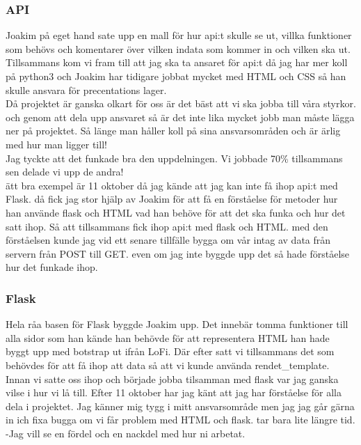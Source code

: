 \documentclass{TDP003mall}
\begin{document}
\subsubsection{API}
Joakim på eget hand sate upp en mall för hur api:t skulle se ut, villka funktioner som behövs och komentarer över vilken indata som kommer in och vilken ska ut. Tillsammans kom vi fram till att jag ska ta ansaret för api:t då jag har mer koll på python3 och Joakim har tidigare jobbat mycket med HTML och CSS så han skulle ansvara för precentations lager.\\
Då projektet är ganska olkart för oss är det bäst att vi ska jobba till våra styrkor. 
och genom att dela upp ansvaret så är det inte lika mycket jobb man måste lägga ner på projektet. Så länge man håller koll på sina ansvarsområden och är ärlig med hur man ligger till!\\ 
Jag tyckte att det funkade bra den uppdelningen. Vi jobbade 70\% tillsammans sen delade vi upp de andra!\\ 
ätt bra exempel är 11 oktober då jag kände att jag kan inte få ihop api:t med Flask. då fick jag stor hjälp av Joakim för att få en förståelse för metoder hur han använde flask och HTML vad han behöve för att det ska funka och hur det satt ihop. Så att tillsammans fick ihop api:t med flask och HTML. 
med den förståelsen kunde jag vid ett senare tillfälle bygga om vår intag av data från servern från POST till GET. even om jag inte byggde upp det så hade förståelse hur det funkade ihop.\\    
\subsubsection{Flask}
Hela råa basen för Flask byggde Joakim upp. Det innebär tomma funktioner till alla sidor som han kände han behövde för att representera HTML han hade byggt upp med botstrap ut ifrån LoFi. Där efter satt vi tillsammans det som behövdes för att få ihop att data så att vi kunde använda rendet\_template. 
Innan vi satte oss ihop och började jobba tilsamman med flask var jag ganska vilse i hur vi lå till. Efter 11 oktober har jag känt att jag har förståelse för alla dela i projektet. Jag känner mig tygg i mitt ansvarsområde men jag jag går gärna in ich fixa bugga om vi får problem med HTML och flask. tar bara lite längre tid.     
-Jag vill se en fördel och en nackdel med hur ni arbetat.
\end{document}
